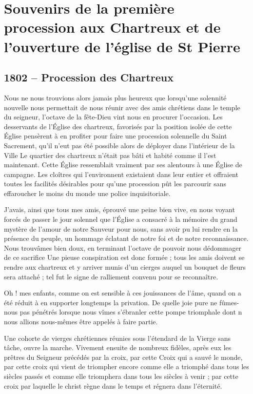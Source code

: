 \documentclass[11pt,a4paper]{report}
\begin{document}
\chapter{Souvenirs de la première procession aux Chartreux et de l'ouverture de l'église de St Pierre}

\section*{1802 -- Procession des Chartreux}

Nous ne nous trouvions alors jamais plus heureux que lorsqu'une solennité nouvelle nous permettait de nous réunir avec des amis chrétiens dans le temple du seigneur, l'octave de la fête-Dieu vint nous en procurer l'occasion. Les desservants de l'Église des chartreux, favorisés par la position isolée de cette Église pensèrent à en profiter pour faire une procession solennelle du Saint Sacrement, qu'il n'eut pas été possible alors de déployer dans l'intérieur de la Ville Le quartier des chartreux n'était pas bâti et habité comme il l'est maintenant. Cette Église ressemblait vraiment par ses alentours à une Église de campagne. Les cloîtres qui l'environnent existaient dans leur entier et offraient toutes les facilités désirables pour qu'une procession pût les parcourir sans effaroucher le moins du monde une police inquisitoriale.

J'avais, ainsi que tous mes amis, éprouvé une peine bien vive, en nous voyant forcés de passer le jour solennel que l'Église a consacré à la mémoire du grand mystère de l'amour de notre Sauveur pour nous, sans avoir pu lui rendre en la présence du peuple, un hommage éclatant de notre foi et de notre reconnaissance. Nous trouvâmes bien doux, en terminant l'octave de pouvoir nous dédommager de ce sacrifice Une pieuse conspiration est donc formée ; tous les amis doivent se rendre aux chartreux et y arriver munis d'un cierges auquel un bouquet de fleurs sera attaché ; tel fut le signe de ralliement convenu pour se reconnaître.

Oh ! mes enfants, comme on est sensible à ces jouissances de l'âme, quand on a été réduit à en supporter longtemps la privation. De quelle joie pure ne fûmes-nous pas pénétrés lorsque nous vîmes s'ébranler cette pompe triomphale dont n nous allions nous-mêmes être appelés à faire partie.

Une cohorte de vierges chrétiennes réunies sous l'étendard de la Vierge sans tâche, ouvre la marche. Vivement ensuite de nombreux fidèles, après eux les prêtres du Seigneur précédés par la croix, par cette Croix qui a sauvé le monde, par cette croix qui vient de triompher encore comme elle a triomphé dans tous les siècles passés et comme elle triomphera dans tous les siècles à venir ; par cette croix par laquelle le christ règne dans le temps et régnera dans l'éternité.
\end{document}
